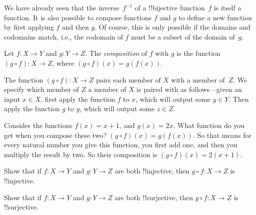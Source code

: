 \documentclass[../../../include/open-logic-section]{subfiles}
\begin{document}

\begin{explain}
We have already seen that the inverse~$f^{-1}$ of a !!{bijective}
function~$f$ is itself a function. It is also possible to compose
functions $f$ and $g$ to define a new function by first applying $f$
and then $g$. Of course, this is only possible if the domains and
codomains match, i.e., the codomain of $f$ must be a subset of the
domain of~$g$.
\end{explain}

\begin{defn}
Let $f\colon X \to Y$ and $g\colon Y \to Z$. The \emph{composition} of
$f$ with $g$ is the function $(g \circ f) \colon X \rightarrow Z$,
where $(g \circ f)(x) = g(f(x))$.
\end{defn}

\begin{explain}
The function $(g \circ f) \colon X \rightarrow Z$ pairs each member of
$X$ with a member of~$Z$. We specify which member of $Z$ a member of
$X$ is paired with as follows---given an input $x \in X$, first apply
the function $f$ to $x$, which will output some $y \in Y$. Then apply
the function $g$ to $y$, which will output some $z \in Z$.
\end{explain}

\begin{ex}
Consider the functions $f(x) = x + 1$, and $g(x) = 2x$. What function
do you get when you compose these two? $(g \circ f)(x) = g(f(x))$. So
that means for every natural number you give this function, you first
add one, and then you multiply the result by two. So their composition
is $(g \circ f)(x) = 2(x+1)$.
\end{ex}

\begin{prob}
Show that if $f \colon X \to Y$ and $g \colon Y \to Z$ are both
!!{injective}, then $g \circ f \colon X \to Z$ is !!{injective}.
\end{prob}

\begin{prob}
Show that if $f \colon X \to Y$ and $g \colon Y \to Z$ are both
!!{surjective}, then $g \circ f \colon X \to Z$ is !!{surjective}.
\end{prob}
\end{document}
